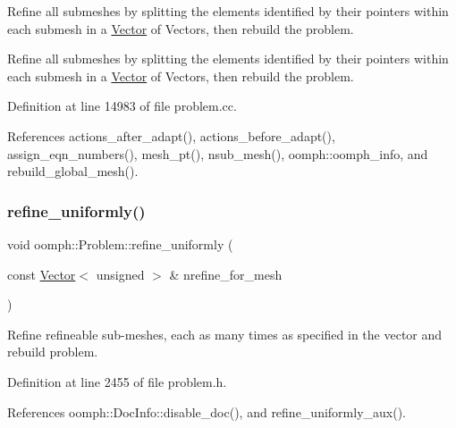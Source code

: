 Refine all submeshes by splitting the elements identified by their pointers within each submesh in a \hyperlink{classoomph_1_1Vector}{Vector} of Vectors, then rebuild the problem. 

Refine all submeshes by splitting the elements identified by their pointers within each submesh in a \hyperlink{classoomph_1_1Vector}{Vector} of Vectors, then rebuild the problem. 

Definition at line 14983 of file problem.\+cc.



References actions\+\_\+after\+\_\+adapt(), actions\+\_\+before\+\_\+adapt(), assign\+\_\+eqn\+\_\+numbers(), mesh\+\_\+pt(), nsub\+\_\+mesh(), oomph\+::oomph\+\_\+info, and rebuild\+\_\+global\+\_\+mesh().

\mbox{\label{classoomph_1_1Problem_a181fa92838f77bd6b12b531dca222c41}} 
\subsubsection{\texorpdfstring{refine\+\_\+uniformly()}{refine\_uniformly()}\hspace{0.1cm}{\footnotesize\ttfamily [1/6]}}
{\footnotesize\ttfamily void oomph\+::\+Problem\+::refine\+\_\+uniformly (\begin{DoxyParamCaption}\item[{const \hyperlink{classoomph_1_1Vector}{Vector}$<$ unsigned $>$ \&}]{nrefine\+\_\+for\+\_\+mesh }\end{DoxyParamCaption})\hspace{0.3cm}{\ttfamily [inline]}}



Refine refineable sub-\/meshes, each as many times as specified in the vector and rebuild problem. 



Definition at line 2455 of file problem.\+h.



References oomph\+::\+Doc\+Info\+::disable\+\_\+doc(), and refine\+\_\+uniformly\+\_\+aux().

\mbox{\label{classoomph_1_1Problem_a14ca1d18e9aa569a6417c45eef70d3ff}} 
